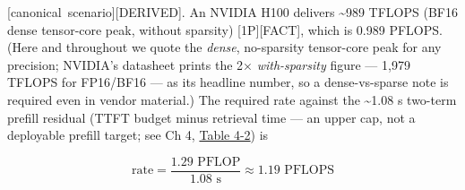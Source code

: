 \mbox{{[}canonical scenario{]}}\hspace{0pt}\mbox{{[}DERIVED{]}}. An NVIDIA H100 delivers
\textasciitilde989 TFLOPS (BF16 dense tensor-core peak, without
sparsity) \mbox{{[}1P{]}}\hspace{0pt}\mbox{{[}FACT{]}}, which is 0.989 PFLOPS. (Here and
throughout we quote the \emph{dense}, no-sparsity tensor-core peak for
any precision; NVIDIA's datasheet prints the 2× \emph{with-sparsity}
figure --- 1,979 TFLOPS for FP16/BF16 --- as its headline number, so a
dense-vs-sparse note is required even in vendor material.) The required
rate against the \textasciitilde1.08 s two-term prefill residual (TTFT
budget minus retrieval time --- an upper cap, not a deployable prefill
target; see Ch 4, \hyperref[tab:4.2]{Table 4-2}) is

\[
\text{rate} = \frac{1.29 \text{ PFLOP}}{1.08 \text{ s}} \approx 1.19 \text{ PFLOPS}
\]

